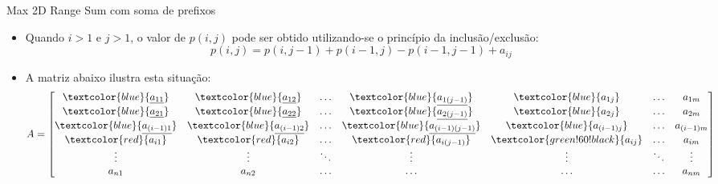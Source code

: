 \begin{frame}[fragile]{Max 2D Range Sum com soma de prefixos}

    \begin{itemize}
        \item Quando $i > 1$ e $j > 1$, o valor de $p(i, j)$ pode ser obtido utilizando-se o
            princípio da inclusão/exclusão:
        \[
            p(i, j) = p(i, j - 1) + p(i - 1, j) - p(i - 1, j - 1) + a_{ij}
        \]
        
        \item A matriz abaixo ilustra esta situação:
        \[
            A = \begin{bmatrix}
                    \textcolor{blue}{\underline{a_{11}}} & \textcolor{blue}{\underline{a_{12}}} &
                        \ldots & \textcolor{blue}{\underline{a_{1(j - 1)}}} & \textcolor{blue}{a_{1j}} & \ldots & a_{1m} \\
                    \textcolor{blue}{\underline{a_{21}}} & \textcolor{blue}{\underline{a_{22}}} &
                        \ldots & \textcolor{blue}{\underline{a_{2(j - 1)}}} & \textcolor{blue}{a_{2j}} & \ldots & a_{2m} \\
                    \textcolor{blue}{\underline{a_{(i - 1)1}}} & \textcolor{blue}{\underline{a_{(i - 1)2}}} &
                        \ldots & \textcolor{blue}{\underline{a_{(i - 1)(j - 1)}}} & \textcolor{blue}{a_{(i - 1)j}} & \ldots & a_{(i - 1)m} \\
                    \textcolor{red}{{a_{i1}}} & \textcolor{red}{{a_{i2}}} &
                        \ldots & \textcolor{red}{{a_{i(j - 1)}}} & \textcolor{green!60!black}{a_{ij}} & \ldots & a_{im} \\
                \vdots & \vdots & \ddots & \vdots & \vdots & \ddots & \vdots \\
                a_{n1} & a_{n2} & \ldots & \ldots & \ldots & \ldots & a_{nm} \\
                \end{bmatrix}
        \]
    \end{itemize}

\end{frame}


